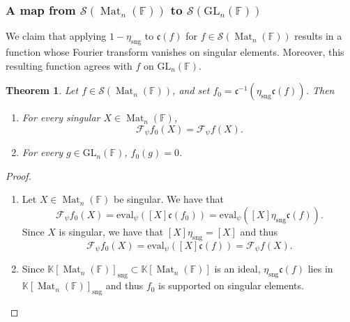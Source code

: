 \documentclass[12pt, reqno]{amsart}
\newtheorem{theorem}{Theorem}[section]
\theoremstyle{definition}
\newcommand{\coefficientsField}{\mathbb{K}}
\newcommand{\fieldCharacter}{\psi}
\newcommand{\GL}{\mathrm{GL}}
\newcommand{\finiteField}{\mathbb{F}}
\newcommand{\squareMatrix}{\operatorname{Mat}}
\newcommand{\fourierTransform}[1]{\mathcal{F}_{#1}}
\newcommand{\Schwartz}{\mathcal{S}}
\newcommand{\evaluation}{\mathrm{eval}}
\newcommand{\singular}{\mathrm{sng}}
\newcommand{\algebraIsomorphism}{\mathfrak{c}}
\begin{document}
\subsubsection{A map from $\Schwartz\left(\squareMatrix_n\left(\finiteField\right)\right)$ to $\Schwartz\left(\GL_n\left(\finiteField\right)\right)$}
We claim that applying $1-\eta_{\singular}$ to $\algebraIsomorphism\left(f\right)$ for $f \in \Schwartz\left(\squareMatrix_n\left(\finiteField\right)\right)$ results in a function whose Fourier transform vanishes on singular elements. Moreover, this resulting function agrees with $f$ on $\GL_n\left(\finiteField\right)$.
\begin{theorem}\label{thm:fourier-transform-of-kovacs-unit-projection}
	Let $f \in \Schwartz\left(\squareMatrix_n\left(\finiteField\right)\right)$, and set $f_0 = \algebraIsomorphism^{-1}\left(\eta_{\singular} \algebraIsomorphism\left(f\right)\right)$. Then
	\begin{enumerate}
		 \item \label{item:fourier-transform-agrees-on-singular-elements} For every singular $X \in \squareMatrix_n\left(\finiteField\right)$,
		 \begin{displaymath}
		 \fourierTransform{\fieldCharacter} f_0\left(X\right) = \fourierTransform{\fieldCharacter}f\left(X\right).
		 \end{displaymath}
		 \item \label{item:function-is-zero-on-regular-elements} For every $g \in \GL_n\left(\finiteField\right)$, $f_0\left(g\right) = 0$.
	\end{enumerate}
\end{theorem}
\begin{proof}
	\begin{enumerate}
		\item Let $X \in \squareMatrix_n\left(\finiteField\right)$ be singular. We have that
		\begin{displaymath}
		\fourierTransform{\fieldCharacter} f_0\left(X\right) = \evaluation_{\fieldCharacter}\left(\left[X\right] \algebraIsomorphism\left(f_0\right)\right) = \evaluation_{\fieldCharacter}\left(\left[X\right] \eta_{\singular} \algebraIsomorphism\left(f\right)\right).
		\end{displaymath}
		Since $X$ is singular, we have that $\left[X\right] \eta_{\singular} = \left[X\right]$ and thus
		\begin{displaymath}
		\fourierTransform{\fieldCharacter} f_0\left(X\right) = \evaluation_{\fieldCharacter}\left(\left[X\right] \algebraIsomorphism\left(f\right)\right) = \fourierTransform{\fieldCharacter} f\left(X\right).
		\end{displaymath}
		\item Since $\coefficientsField\left[\squareMatrix_n\left(\finiteField\right)\right]_{\singular} \subset \coefficientsField\left[\squareMatrix_n\left(\finiteField\right)\right]$ is an ideal, $\eta_{\singular} \algebraIsomorphism\left(f\right)$ lies in $\coefficientsField\left[\squareMatrix_n\left(\finiteField\right)\right]_{\singular}$ and thus $f_0$ is supported on singular elements.
	\end{enumerate}
\end{proof}
\end{document}
